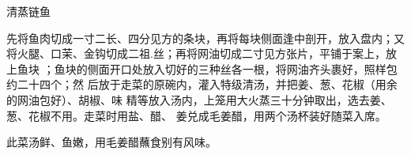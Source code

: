 \begin{recipe}{清蒸链鱼}

\ingredients


\preparation

\step 先将鱼肉切成一寸二长、四分见方的条块，再将每块侧面逢中剖开，放入盘内；又
将火腿、口茉、金钩切成二祖.丝；再将网油切成二寸见方张片，平铺于案上，放上鱼块
；鱼块的侧面开口处放入切好的三种丝各一根，将网油齐头裹好，照样包约二十四个；然
后放于走菜的原碗内，灌入特级清汤，并把姜、葱、花椒（用余的网油包好）、胡椒、味
精等放入汤内，上笼用大火蒸三十分钟取出，选去姜、葱、花椒不用。走菜时用盐、醋、
姜兑成毛姜醋，用两个汤杯装好随菜入席。

\features

此菜汤鲜、鱼嫩，用毛姜醋蘸食别有风味。

\end{recipe}

